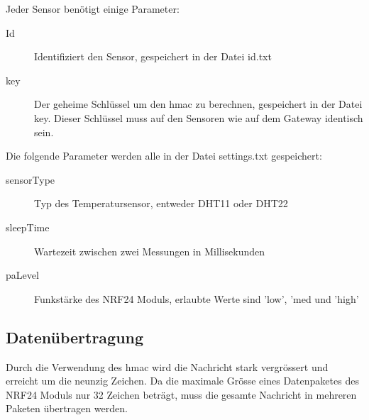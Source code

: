 \documentclass[
  12pt, %
  a4paper, %
  oneside, %
  openany, 
  numbers=noenddot, %
  BCOR=5mm, %
  parskip=half*, %
  thesis, %
]{bfhbook}
\begin{document}
 Jeder Sensor benötigt einige Parameter:
 \begin{description}
\item[Id] Identifiziert den Sensor, gespeichert in der Datei id.txt
\item[key] Der geheime Schlüssel um den \Gls{hmac} zu berechnen, gespeichert in der Datei key. Dieser Schlüssel muss auf den Sensoren wie auf dem Gateway identisch sein.
\end{description}
Die folgende Parameter werden alle in der Datei settings.txt gespeichert:
 \begin{description}
\item[sensorType] Typ des Temperatursensor, entweder DHT11 oder DHT22
\item[sleepTime] Wartezeit zwischen zwei Messungen in Millisekunden
\item[paLevel] Funkstärke des NRF24 Moduls, erlaubte Werte sind 'low', 'med und 'high'
\end{description}

\subsection{Datenübertragung}Durch die Verwendung des \Gls{hmac} wird die Nachricht stark vergrössert und erreicht um die neunzig Zeichen.
Da die maximale Grösse eines Datenpaketes des NRF24 Moduls nur 32 Zeichen beträgt, muss die gesamte Nachricht in mehreren Paketen übertragen werden.
\end{document}
